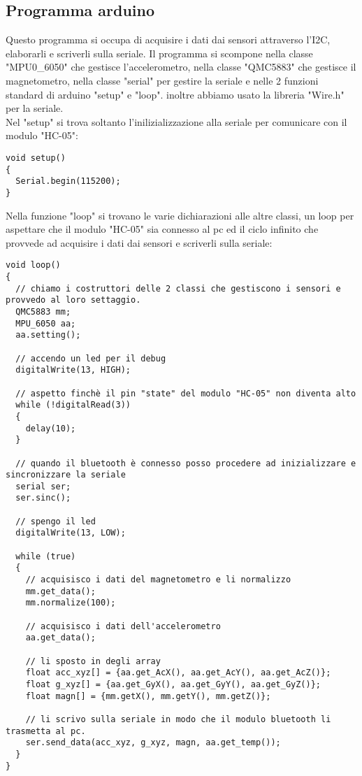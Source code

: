 \documentclass[10pt,a4paper]{article}
\begin{document}
\subsection{Programma arduino}
Questo programma si occupa di acquisire i dati dai sensori attraverso l'I2C, elaborarli e scriverli sulla seriale. Il programma si scompone nella classe "MPU0\_6050" che gestisce l'accelerometro, nella classe "QMC5883" che gestisce il magnetometro, nella classe "serial" per gestire la seriale e nelle 2 funzioni standard di arduino "setup" e "loop". inoltre abbiamo usato la libreria "Wire.h" per la seriale. \\
Nel "setup" si trova soltanto l'inilizializzazione alla seriale per comunicare con il modulo "HC-05":
\begin{lstlisting}[style=myArduino, caption=funzione "setup", captionpos=b]
void setup() 
{
  Serial.begin(115200);
}
\end{lstlisting}
Nella funzione "loop" si trovano le varie dichiarazioni alle altre classi, un loop per aspettare che il modulo "HC-05" sia connesso al pc ed il ciclo infinito che provvede ad acquisire i dati dai sensori e scriverli sulla seriale:
\begin{lstlisting}[style=myArduino, caption=funzione "loop", captionpos=b]
void loop() 
{
  // chiamo i costruttori delle 2 classi che gestiscono i sensori e provvedo al loro settaggio.
  QMC5883 mm;
  MPU_6050 aa;
  aa.setting();

  // accendo un led per il debug  
  digitalWrite(13, HIGH);
  
  // aspetto finchè il pin "state" del modulo "HC-05" non diventa alto
  while (!digitalRead(3))
  {
    delay(10);
  }
  
  // quando il bluetooth è connesso posso procedere ad inizializzare e sincronizzare la seriale
  serial ser; 
  ser.sinc(); 

  // spengo il led
  digitalWrite(13, LOW);
  
  while (true)
  {
    // acquisisco i dati del magnetometro e li normalizzo
    mm.get_data();
    mm.normalize(100);
    
    // acquisisco i dati dell'accelerometro
    aa.get_data();

    // li sposto in degli array
    float acc_xyz[] = {aa.get_AcX(), aa.get_AcY(), aa.get_AcZ()};
    float g_xyz[] = {aa.get_GyX(), aa.get_GyY(), aa.get_GyZ()};
    float magn[] = {mm.getX(), mm.getY(), mm.getZ()};

    // li scrivo sulla seriale in modo che il modulo bluetooth li trasmetta al pc.
    ser.send_data(acc_xyz, g_xyz, magn, aa.get_temp());
  }
}
\end{lstlisting}
\end{document}
